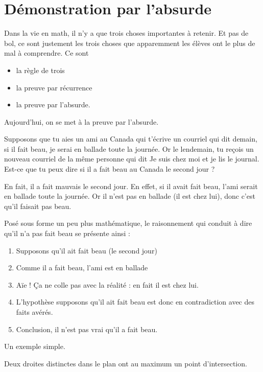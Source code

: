 

\section{Démonstration par l'absurde}

Dans la vie en math, il n'y a que trois choses importantes à retenir. Et pas de bol, ce sont justement les trois choses que apparemment les élèves ont le plus de mal à comprendre. Ce sont
\begin{itemize}
\item la règle de trois
\item la preuve par récurrence
\item la preuve par l'absurde.
\end{itemize}
Aujourd'hui, on se met à la preuve par l'absurde.

Supposons que tu aies un ami au Canada qui t'écrive un courriel qui dit \og demain, si il fait beau, je serai en ballade toute la journée\fg. Or le lendemain, tu reçois un nouveau courriel de la même personne qui dit \og Je suis chez moi et je lis le journal\fg. Est-ce que tu peux dire si il a fait beau au Canada le second jour ?

En fait, il a fait mauvais le second jour. En effet, si il avait fait beau, l'ami serait en ballade toute la journée. Or il n'est pas en ballade (il est chez lui), donc c'est qu'il faisait pas beau.

Posé sous forme un peu plus mathématique, le raisonnement qui conduit à dire qu'il n'a pas fait beau se présente ainsi :
\begin{enumerate}
\item Supposons qu'il ait fait beau (le second jour)
\item Comme il a fait beau, l'ami est en ballade
\item Aïe ! Ça ne colle pas avec la réalité : en fait il est chez lui.
\item L'hypothèse \og supposons qu'il ait fait beau\fg{}  est donc en contradiction avec des faits avérés.
\item Conclusion, il n'est pas vrai qu'il a fait beau.
\end{enumerate}

Un exemple simple.
\begin{proposition}
Deux droites distinctes dans le plan ont au maximum un point d'intersection.
\end{proposition}

